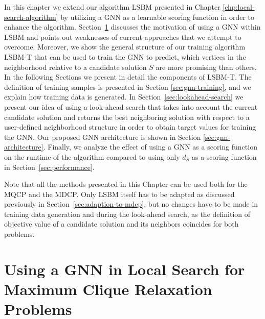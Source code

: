 \documentclass[draft,final]{vutinfth} %
\begin{document}
In this chapter we extend our algorithm LSBM presented in Chapter \ref{chp:local-search-algorithm} by utilizing a GNN as a learnable scoring function in order to enhance the algorithm. 
Section~\ref{sec:gnn-local-search} discusses the motivation of using a GNN within LSBM and points out weaknesses of current approaches that we attempt to overcome. Moreover, we show the general structure of our training algorithm LSBM-T that can be used to train the GNN to predict, which vertices in the neighborhood relative to a candidate solution $S$ are more promising than others. 
In the following Sections we present in detail the components of LSBM-T. The definition of training samples is presented in Section \ref{sec:gnn-training}, and we explain how training data is generated.  
In Section~\ref{sec:lookahead-search} we present our idea of using a look-ahead search that takes into account the current candidate solution and returns the best neighboring solution with respect to a user-defined neighborhood structure in order to obtain target values for training the GNN. 
Our proposed GNN architecture is shown in Section \ref{sec:gnn-architecture}. 
Finally, we analyze the effect of using a GNN as a scoring function on the runtime of the algorithm compared to using only $d_S$ as a scoring function in Section~\ref{sec:performance}. 

Note that all the methods presented in this Chapter can be used both for the MQCP and the MDCP. Only LSBM itself has to be adapted as discussed previously in Section~\ref{sec:adaption-to-mdcp}, but no changes have to be made in training data generation and during the look-ahead search, as the definition of objective value of a candidate solution and its neighbors coincides for both problems. 

\section{Using a GNN in Local Search for Maximum Clique Relaxation Problems}\label{sec:gnn-local-search}
\end{document}
